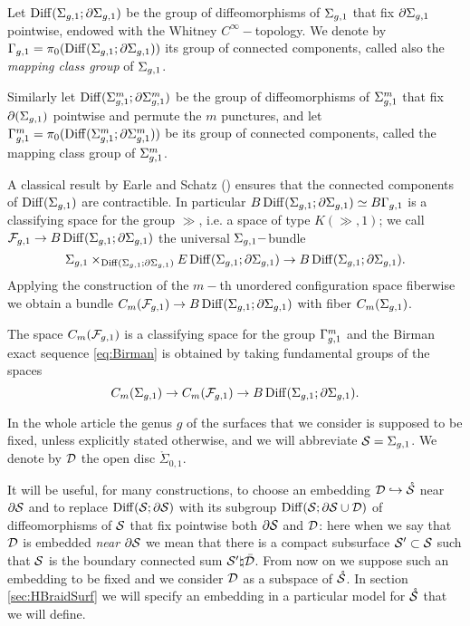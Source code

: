 \begin{defn}
 \label{def:mcg}
 Let $\Diff(\sg;\partial\sg)$ be the group of diffeomorphisms of $\sg$ that fix $\partial\sg$ pointwise,
 endowed with the Whitney $C^{\infty}-$topology. We denote by $\gg=\pi_0(\Diff(\sg;\partial\sg))$ its group of connected
 components, called also the \emph{mapping class group} of $\sg$.
 
 Similarly let $\Diff(\sgm;\partial\sgm)$ be the group of diffeomorphisms of $\sgm$ that fix $\partial(\sg)$
 pointwise and permute the $m$ punctures, and let $\ggm=\pi_0(\Diff(\sgm;\partial\sgm))$ be its
 group of connected components, called the mapping class group of $\sgm$.
 \end{defn}
 A classical result by Earle and Schatz (\cite{EarleSchatz}) ensures that the connected components
 of $\Diff(\sg)$ are contractible. In particular $B\Diff(\sg;\partial\sg)\simeq B\gg$ is
 a classifying space for
 the group $\gg$, i.e. a space of type $K(\gg,1)$; we call $\cF_{g,1}\to B\Diff(\sg;\partial\sg)$ the universal
 $\sg-$bundle
 \[
  \sg\times_{\Diff(\sg;\partial\sg)}E\Diff(\sg;\partial\sg)\to B\Diff(\sg;\partial\sg).
 \]
Applying the construction of the $m-$th unordered configuration space fiberwise we obtain a bundle
$C_m(\cF_{g,1})\to B\Diff(\sg;\partial\sg)$ with fiber $C_m(\sg)$.

The space $C_m(\cF_{g,1})$ is a classifying space for the
group $\ggm$ and the Birman exact sequence \ref{eq:Birman} is obtained by taking fundamental
groups of the spaces
\begin{equation}\label{eq:Birmanbundle}
C_m(\sg)\to C_m(\cF_{g,1})\to B\Diff(\sg;\partial\sg).
\end{equation}

In the whole article the genus $g$ of the surfaces that we consider is supposed to be fixed,
unless explicitly stated otherwise, and we will abbreviate $\S=\sg$.
We denote by $\D$ the open disc $\mathring{\Sigma}_{0,1}$.

It will be useful, for many constructions, to choose an embedding
$\D\hookrightarrow\mrS$ near $\partial\S$ and to replace
$\Diff(\S;\partial\S)$ with its subgroup $\Diff(\S;\partial\S\cup\D)$ of diffeomorphisms
of $\S$ that fix pointwise both $\partial\S$ and $\D$: here when we say that $\D$ is embedded
\emph{near $\partial\S$} we mean that there is a compact subsurface $\S'\subset\S$
such that $\S$ is the boundary connected sum $\S'\natural\bar\D$.
From now on we suppose such an embedding to be fixed and we consider $\D$ as a subspace
of $\mrS$. In section \ref{sec:HBraidSurf} we will specify an
embedding in a particular model for $\mrS$ that we will define.

